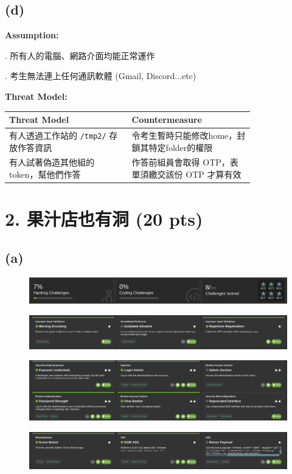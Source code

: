 \documentclass[12pt]{article}
\begin{document}
\subsection*{(d)}
\noindent \textbf{Assumption:}

. 所有人的電腦、網路介面均能正常運作

. 考生無法連上任何通訊軟體 (Gmail, Discord...etc)

\noindent \textbf{Threat Model:}

\begin{center}
\begin{tabular}{ |p{0.4\linewidth}|p{0.4\linewidth}| } 
 \hline
 Threat Model & Countermeasure \\
 \hline
 有人透過工作站的 \verb|/tmp2/| 存放作答資訊 & 令考生暫時只能修改home，封鎖其特定folder的權限 \\ 
 \hline
 有人試著偽造其他組的 token，幫他們作答 & 作答前組員會取得 OTP，表單須繳交該份 OTP 才算有效 \\ 
 \hline
\end{tabular}
\end{center}

\newpage
\section*{2. 果汁店也有洞 (20 pts)}
\subsection*{(a)}
\begin{figure}[H]
    \centering
    \includegraphics[width=0.5\linewidth]{image copy 3.png}
\end{figure}
\begin{figure}[H]
    \centering
    \includegraphics[width=0.5\linewidth]{image.png}
\end{figure}
\begin{figure}[H]
    \centering
    \includegraphics[width=0.5\linewidth]{image copy.png}
\end{figure}
\begin{figure}[H]
    \centering
    \includegraphics[width=0.5\linewidth]{image copy 2.png}
\end{figure}
\end{document}

